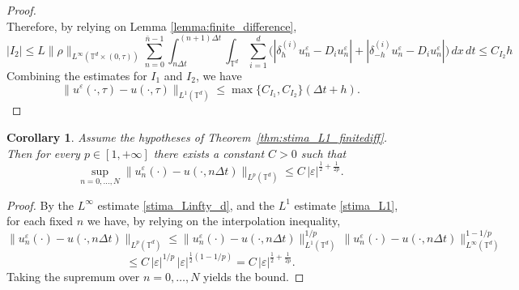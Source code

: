\documentclass[11pt]{amsart}
\newtheorem{cor}[thm]{Corollary}
\theoremstyle{remark}
\theoremstyle{definition}
\theoremstyle{Claim}
\newcommand{\T}{{\mathbb{T}}}
\theoremstyle{plain}
\begin{document}
\begin{proof}
\[\]
Therefore, by relying on Lemma \ref{lemma:finite_difference}, 
\begin{equation}\label{I2_bound}
|I_2|
\le
L\|\rho\|_{L^\infty(\T^d\times(0,\tau))}
\sum_{n=0}^{\bar n-1}
\int_{n\Delta t}^{(n+1)\Delta t}
\int_{\T^d}
\sum_{i=1}^d
\Big(
|\delta_h^{(i)}u_n^\varepsilon-D_i u_n^\varepsilon|
+
|\delta_{-h}^{(i)}u_n^\varepsilon-D_i u_n^\varepsilon|
\Big)\,dx\,dt\leq C_{I_2} h
\end{equation}
Combining the estimates for \(I_1\) and \(I_2\), we have
\[
\|u^\varepsilon(\cdot,\tau)-u(\cdot,\tau)\|_{L^1(\T^d)}
\le \max\{C_{I_1},C_{I_2}\}(\Delta t + h).
\]
\end{proof}

\begin{cor}\label{cor:stima_Lp}
Assume the hypotheses of Theorem~\ref{thm:stima_L1_finitediff}. Then for every $p\in[1,+\infty]$ there exists a constant $C>0$ such that
\[
\sup_{n=0,\dots,N}\big\| u_n^\varepsilon(\cdot)-u(\cdot,n\Delta t)\big\|_{L^p(\T^d)}
\le C\,|\varepsilon|^{\frac12+\frac{1}{2p}}.
\]
\end{cor}

\begin{proof}
By the $L^\infty$ estimate \eqref{stima_Linfty_d}, and the $L^1$ estimate \eqref{stima_L1}, for each fixed $n$ we have, by relying on the interpolation inequality,
\[
\| u_n^\varepsilon(\cdot)-u(\cdot,n\Delta t)\|_{L^p(\T^d)}
\le \| u_n^\varepsilon(\cdot)-u(\cdot,n\Delta t)\|_{L^1(\T^d)}^{1/p}\,\| u_n^\varepsilon(\cdot)-u(\cdot,n\Delta t)\|_{L^\infty(\T^d)}^{1-1/p}
\]
\[\le C\,|\varepsilon|^{1/p}\,|\varepsilon|^{\frac12(1-1/p)}
= C\,|\varepsilon|^{\frac12+\frac{1}{2p}}.
\]
Taking the supremum over $n=0,\dots,N$ yields the bound.
\end{proof}


\end{document}
